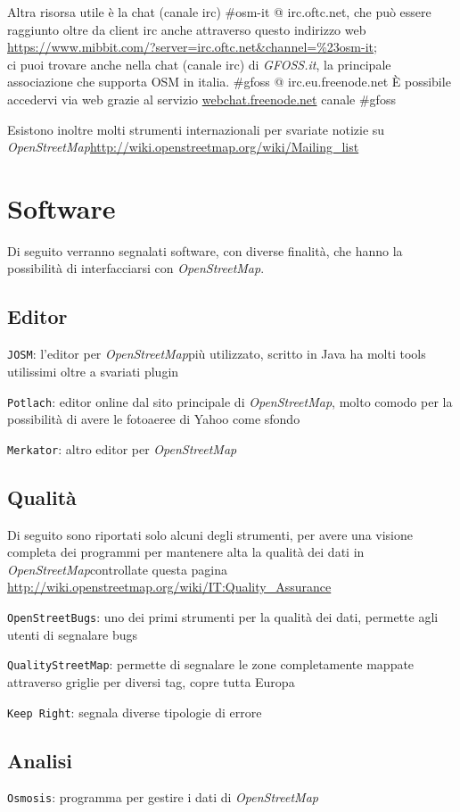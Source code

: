 \documentclass[a4paper,twoside,12pt,]{article}
\newcommand{\osm}{\emph{OpenStreetMap\xspace}}
\begin{document}
Altra risorsa utile è la chat (canale irc) \#osm-it @ irc.oftc.net, che può essere raggiunto oltre da client irc anche attraverso questo indirizzo web \url{https://www.mibbit.com/?server=irc.oftc.net\&channel=\%23osm-it}; \\ci puoi trovare anche nella chat (canale irc) di \emph{GFOSS.it}, la principale associazione che supporta OSM in italia. \#gfoss @ irc.eu.freenode.net 
È possibile accedervi via web grazie al servizio \url{webchat.freenode.net}  canale \#gfoss

Esistono inoltre molti strumenti internazionali per svariate notizie su \osm \url{http://wiki.openstreetmap.org/wiki/Mailing_list}

\section{Software}
Di seguito verranno segnalati software, con diverse finalità, che hanno la possibilità di interfacciarsi con \osm.

\subsection{Editor}
\texttt{JOSM}: l'editor per \osm più utilizzato, scritto in Java ha molti tools utilissimi oltre a svariati plugin

\texttt{Potlach}: editor online dal sito principale di \osm, molto comodo per la possibilità di avere le fotoaeree di Yahoo come sfondo

\texttt{Merkator}: altro editor per \osm

\subsection{Qualità}
Di seguito sono riportati solo alcuni degli strumenti, per avere una visione completa dei programmi per mantenere alta la qualità dei dati in \osm controllate questa pagina \url{http://wiki.openstreetmap.org/wiki/IT:Quality_Assurance}

\texttt{OpenStreetBugs}: uno dei primi strumenti per la qualità dei dati, permette agli utenti di segnalare bugs

\texttt{QualityStreetMap}: permette di segnalare le zone completamente mappate attraverso griglie per diversi tag, copre tutta Europa

\texttt{Keep Right}: segnala diverse tipologie di errore

\subsection{Analisi}
\texttt{Osmosis}: programma per gestire i dati di \osm
\end{document}
